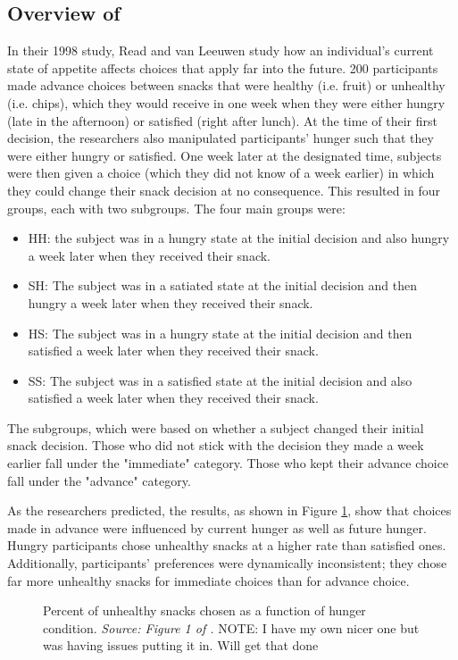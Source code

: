\documentclass[12pt]{article}
\begin{document}
\subsection{Overview of \cite{read_leeuwen_1998}}
	In their 1998 study, Read and van Leeuwen study how an individual's current state of appetite affects choices that apply far into the future. 200 participants made advance choices between snacks that were healthy (i.e. fruit) or unhealthy (i.e. chips), which they would receive in one week when they were either hungry (late in the afternoon) or satisfied (right after lunch). At the time of their first decision, the researchers also manipulated participants' hunger such that they were either hungry or satisfied. One week later at the designated time, subjects were then given a choice (which they did not know of a week earlier) in which they could change their snack decision at no consequence. This resulted in four groups, each with two subgroups. The four main groups were:
	\begin{itemize}
		\item HH: the subject was in a hungry state at the initial decision and also hungry a week later when they received their snack.
		\item SH: The subject was in a satiated state at the initial  decision and then hungry a week later when they received their snack.
		\item HS: The subject was in a hungry state at the initial decision and then satisfied a week later when they received their snack.
		\item SS: The subject was in a satisfied state at the initial decision and also satisfied a week later when they received their snack. 
	\end{itemize}
	The subgroups, which were based on whether a subject changed their initial snack decision. Those who did not stick with the decision they made a week earlier fall under the "immediate" category. Those who kept their advance choice fall under the "advance" category. 
	
	As the researchers predicted, the results, as shown in Figure \ref{fig:r}, show that choices made in advance were influenced by current hunger as well as future hunger. Hungry participants chose unhealthy snacks at a higher rate than satisfied ones. Additionally, participants' preferences were dynamically inconsistent; they chose far more unhealthy snacks for immediate choices than for advance choice. 
	\begin{figure}[h]
	\caption{Percent of unhealthy snacks chosen as a function of hunger condition. {\em Source: Figure 1 of \cite{read_leeuwen_1998}.} NOTE: I have my own nicer one but was having issues putting it in. Will get that done}
	\label{fig:r}
	\end{figure}
\end{document}
